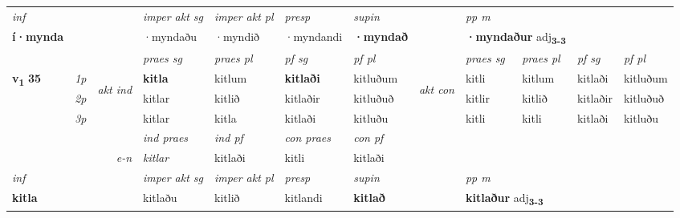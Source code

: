\begin{longtable}[l]{X>{\footnotesize\itshape}llXXXXlXXXX}
   {\textit{inf}} & &  & \textit{imper akt sg} & \textit{imper akt pl}   & \textit{presp} & \textit{supin}  && \textit{pp m} \\*
  {\textbf{í\allowbreak ·mynda}} & && ·myndaðu  & ·myndið   & ·myndandi &  \textbf{·myndað}  && \multicolumn{2}{l}{\textbf{·myndaður} adj\textbf{\textsubscript{3-3}}} \\*

\midrule

 & &   & \textit{praes sg}  & \textit{praes pl}    & \textit{ pf sg} & \textit{pf pl} & & \textit{praes sg}  & \textit{praes pl}    & \textit{pf sg} & \textit{pf pl }  \\ \cmidrule{4-7} \cmidrule{9-12}
 \multirow{2}{*}{{{\textbf{v{\textsubscript{1}}} \Large{\textbf{35}}}}}  & 1p & \multirow{3}{*}{\begin{turn}{90}\textit{akt ind}\end{turn}} & \textbf{kitla} & kitlum & \textbf{kitlaði} & kitluðum & \multirow{3}{*}{\begin{turn}{90}\textit{akt con}\end{turn}} &kitli & kitlum & kitlaði & kitluðum\\*
 & 2p &  &  kitlar  & kitlið & kitlaðir & kitluðuð & & kitlir & kitlið & kitlaðir & kitluðuð \\*
 & 3p &  & kitlar & kitla & kitlaði & kitluðu & & kitli & kitli& kitlaði & kitluðu \\*
\cmidrule{4-7} \cmidrule{9-12}

   && &  \textit{ind praes} & \textit{ind pf} & \textit{con praes} & \textit{con pf} \\*
\multicolumn{3}{r}{\textit{e-n}} & kitlar & kitlaði & kitli & kitlaði \\*

\cmidrule{4-7}
   {\textit{inf}} & &  & \textit{imper akt sg} & \textit{imper akt pl}   & \textit{presp} & \textit{supin}  && \textit{pp m} \\*
  {\textbf{kitla}} & && kitlaðu  & kitlið   & kitlandi &  \textbf{kitlað}  && \multicolumn{2}{l}{\textbf{kitlaður} adj\textbf{\textsubscript{3-3}}} \\*

\midrule


\end{longtable}
